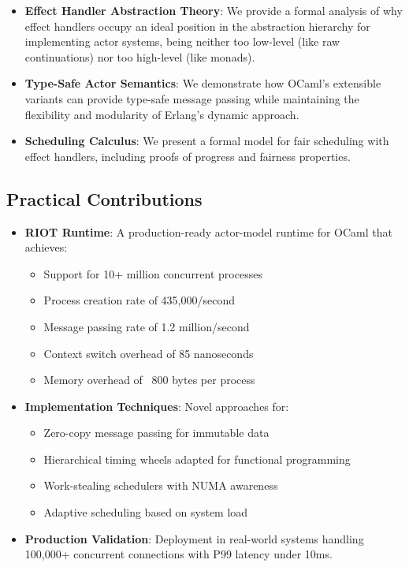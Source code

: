 \documentclass[12pt,a4paper]{report}
\begin{document}
\begin{itemize}
\item \textbf{Effect Handler Abstraction Theory}: We provide a formal analysis of why effect handlers occupy an ideal position in the abstraction hierarchy for implementing actor systems, being neither too low-level (like raw continuations) nor too high-level (like monads).

\item \textbf{Type-Safe Actor Semantics}: We demonstrate how OCaml's extensible variants can provide type-safe message passing while maintaining the flexibility and modularity of Erlang's dynamic approach.

\item \textbf{Scheduling Calculus}: We present a formal model for fair scheduling with effect handlers, including proofs of progress and fairness properties.
\end{itemize}

\subsection{Practical Contributions}

\begin{itemize}
\item \textbf{RIOT Runtime}: A production-ready actor-model runtime for OCaml that achieves:
  \begin{itemize}
  \item Support for 10+ million concurrent processes
  \item Process creation rate of 435,000/second
  \item Message passing rate of 1.2 million/second
  \item Context switch overhead of 85 nanoseconds
  \item Memory overhead of ~800 bytes per process
  \end{itemize}

\item \textbf{Implementation Techniques}: Novel approaches for:
  \begin{itemize}
  \item Zero-copy message passing for immutable data
  \item Hierarchical timing wheels adapted for functional programming
  \item Work-stealing schedulers with NUMA awareness
  \item Adaptive scheduling based on system load
  \end{itemize}

\item \textbf{Production Validation}: Deployment in real-world systems handling 100,000+ concurrent connections with P99 latency under 10ms.
\end{itemize}
\end{document}
